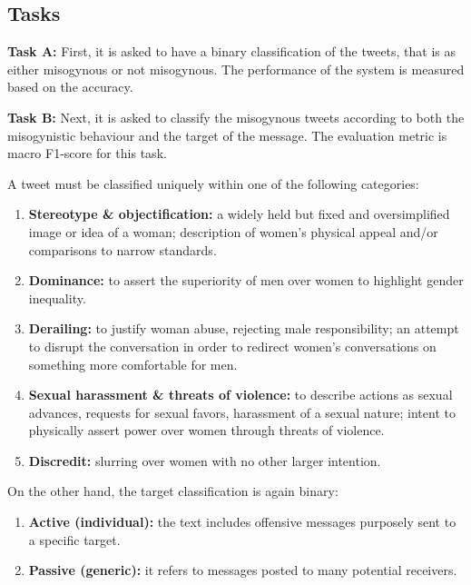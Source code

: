 \documentclass[11pt]{article}
\begin{document}
\subsection{Tasks}

\noindent\textbf{Task A: }
First, it is asked to have a binary classification of the tweets, that is as either misogynous or not misogynous. The performance of the system is measured based on the accuracy.

\noindent\textbf{Task B: }
Next, it is asked to classify the misogynous tweets according to both the misogynistic behaviour and the target of the message. The evaluation metric is macro F1-score for this task.

A tweet must be classified uniquely within one of the following categories:

\begin{enumerate}
    \item \textbf{Stereotype \& objectification:} a widely held but fixed and oversimplified image or idea of a woman; description of women's physical appeal and/or comparisons to narrow standards.
    \item \textbf{Dominance:} to assert the superiority of men over women to highlight gender inequality.
    \item \textbf{Derailing:} to justify woman abuse, rejecting male responsibility; an attempt to disrupt the conversation in order to redirect  women's conversations on something more comfortable for men.
    \item \textbf{Sexual harassment \& threats of violence:} to describe actions as sexual advances, requests for sexual favors, harassment of a sexual nature; intent to physically assert power over women through threats of violence.
    \item \textbf{Discredit:} slurring over women with no other larger intention.
\end{enumerate}




On the other hand, the target classification is again binary:
\begin{enumerate}
    \item \textbf{Active (individual):} the text includes offensive messages purposely sent to a specific target.
    \item \textbf{Passive (generic):} it refers to messages posted to many potential receivers.
\end{enumerate}
\end{document}
